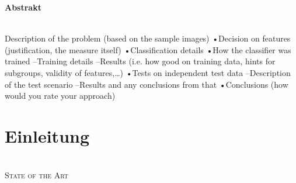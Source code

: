\documentclass[liststotoc,11pt,a4paper]{article}
\begin{document}
\thispagestyle{empty}
\newpage
\setcounter{page}{1}
\tableofcontents                %
\newpage

\normal
\Large \bfseries Abstrakt\\
\normalsize \mdseries
{}
\\
Description of the problem (based on the sample images)
•Decision on features (justification, the measure itself)
•Classification details
•How the classifier was trained
–Training details
–Results (i.e. how good on training data, hints for subgroups, validity of features,…)
•Tests on independent test data
–Description of the test scenario
–Results and any conclusions from that
•Conclusions (how would you rate your approach)
\section{Einleitung}
\label{firstSec}

\scshape \\State of the Art\\ 
\newline 
\normalfont

\newpage
{}	%
\setcounter{page}{6}
\renewcommand{\refname}{Referenzen}


\end{document}
